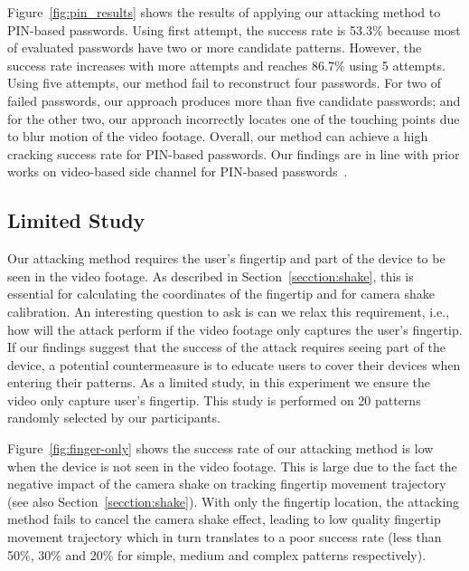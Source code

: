         Figure~\ref{fig:pin_results} shows the
        results of applying our attacking method to PIN-based passwords.
        Using first attempt, the success rate is  53.3\% because most of
        evaluated passwords have two or more candidate patterns. However, the
        success rate increases with more attempts and reaches 86.7\% using 5
        attempts. Using five attempts, our method fail to reconstruct four
        passwords. For two of failed passwords, our approach produces more
        than five candidate passwords; and for the other two, our approach
        incorrectly locates one of the touching points due to  blur
        motion of the video footage. Overall, our method can achieve a high
        cracking success rate for PIN-based passwords. Our findings are in
        line with prior works on video-based side channel for PIN-based
        passwords~\cite{shukla2014beware}.

%


\subsection{Limited Study}
\label{section: limited-study}

Our attacking method requires the user's fingertip and part of the device to be seen in the video footage.  As
described in Section~\ref{secction:shake}, this is essential for calculating the coordinates of the fingertip and for
camera shake calibration. An interesting question to ask is can we relax this requirement, i.e., how will the attack
perform if the video footage only captures the user's fingertip. If our findings
suggest that the success of the attack requires seeing part of the device, a potential countermeasure is to educate users to cover their devices when entering their patterns.
As a limited study, in this experiment we ensure the video only capture user's fingertip. This study is performed on 20 patterns randomly selected by our participants.

Figure~\ref{fig:finger-only} shows the success rate of our attacking method is low when the device is not seen in the video footage.
This is large due to the fact the negative impact of the camera shake on tracking fingertip movement trajectory (see also Section~\ref{secction:shake}).
With only the fingertip location, the attacking method fails to cancel the camera shake effect, leading to low quality fingertip movement trajectory
which in turn translates to a poor success rate (less than 50\%, 30\% and 20\% for simple, medium and complex patterns respectively).

